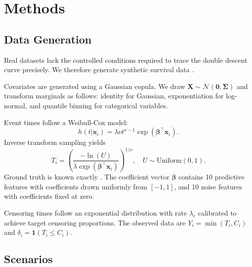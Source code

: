 \documentclass[12pt,a4paper]{article}
\newcommand{\N}{\mathcal{N}}
\newcommand{\bx}{\bm{x}}
\newcommand{\bbeta}{\bm{\beta}}
\begin{document}
\section{Methods}

\subsection{Data Generation}

Real datasets lack the controlled conditions required to trace the double descent curve precisely. We therefore generate synthetic survival data . 

Covariates are generated using a Gaussian copula. We draw $\bm{X} \sim \N(\bm{0}, \bm{\Sigma})$ and transform marginals as follows: identity for Gaussian, exponentiation for log-normal, and quantile binning for categorical variables.

Event times follow a Weibull-Cox model:
\begin{equation}
    h(t | \bx_i) = \lambda \nu t^{\nu - 1} \exp(\bbeta^\top \bx_i).
\end{equation}
Inverse transform sampling yields
\begin{equation}
    T_i = \left( \frac{-\ln(U)}{\lambda \exp(\bbeta^\top \bx_i)} \right)^{1/\nu}, \quad U \sim \text{Uniform}(0, 1).
\end{equation}
Ground truth is known exactly \citep{bender2005generating}. The coefficient vector $\bbeta$ contains 10 predictive features with coefficients drawn uniformly from $[-1, 1]$, and 10 noise features with coefficients fixed at zero.

Censoring times follow an exponential distribution with rate $\lambda_c$ calibrated to achieve target censoring proportions. The observed data are $Y_i = \min(T_i, C_i)$ and $\delta_i = \mathbf{1}(T_i \leq C_i)$.

\subsection{Scenarios}
\end{document}
